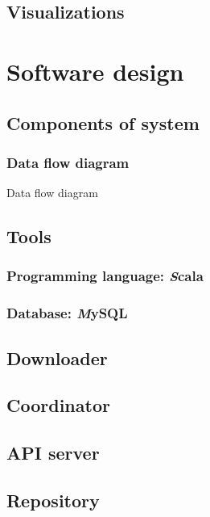 \documentclass[a4paper,12pt]{article}
\begin{document}
    \subsection{Visualizations}

    
    \clearpage
    
    \section{Software design}
    \subsection{Components of system}
  	\subsubsection{Data flow diagram}
		Data flow diagram
		
    
    \subsection{Tools}
    \subsubsection{Programming language: {\textit Scala}}
    \subsubsection{Database: {\textit MySQL}}
    \subsection{Downloader}
    \subsection{Coordinator}
    \subsection{API server}
    \subsection{Repository}
\end{document}
